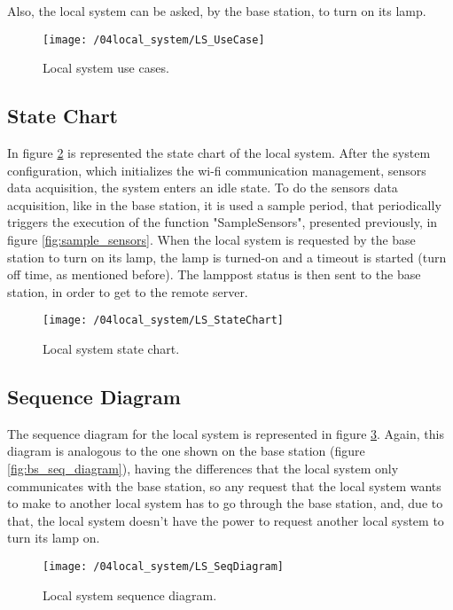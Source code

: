 Also, the local system can be asked, by the base station, to turn on its lamp.
\clearpage

\begin{figure}[ht]
	\centering
	\texttt{[image: /04local\_system/LS\_UseCase]}
	\caption{Local system use cases.}
	\label{fig:ls_use_cases}
\end{figure}

\subsection{State Chart}
In figure \ref{fig:ls_state_chart} is represented the state chart of the local system. After the system configuration, which initializes the wi-fi communication management, sensors data acquisition, the system enters an idle state. To do the sensors data acquisition, like in the base station, it is used a sample period, that periodically triggers the execution of the function "SampleSensors", presented previously, in figure \ref{fig:sample_sensors}. When the local system is requested by the base station to turn on its lamp, the lamp is turned-on and a timeout is started (turn off time, as mentioned before). The lamppost status is then sent to the base station, in order to get to the remote server.

\begin{figure}[ht]
	\centering
	\texttt{[image: /04local\_system/LS\_StateChart]}
	\caption{Local system state chart.}
	\label{fig:ls_state_chart}
\end{figure}

\clearpage
\subsection{Sequence Diagram}
The sequence diagram for the local system is represented in figure \ref{fig:ls_seq_diagram}. Again, this diagram is analogous to the one shown on the base station (figure \ref{fig:bs_seq_diagram}), having the differences that the local system only communicates with the base station, so any request that the local system wants to make to another local system has to go through the base station, and, due to that, the local system doesn't have the power to request another local system to turn its lamp on.

\begin{figure}[ht]
	\centering
	\texttt{[image: /04local\_system/LS\_SeqDiagram]}
	\caption{Local system sequence diagram.}
	\label{fig:ls_seq_diagram}
\end{figure}